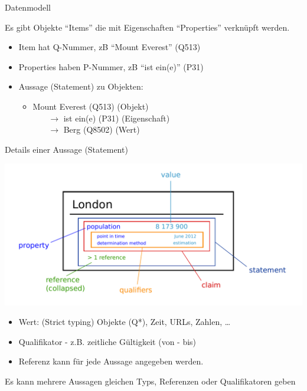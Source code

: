\documentclass{beamer}
\begin{document}
\begin{frame}{Datenmodell}

  Es gibt Objekte "`Items"' die mit Eigenschaften "`Properties"' verknüpft werden.

  \begin{itemize}
    \item Item hat Q-Nummer, zB "`Mount Everest"' (Q513) \pause

    \item  Properties haben P-Nummer, zB "`ist ein(e)"' (P31) \pause

    \item Aussage (Statement) zu Objekten:
    
    \begin{itemize}
      \item Mount Everest (Q513) (Objekt) \\
        ~~~ $\rightarrow$ ist ein(e) (P31) (Eigenschaft) \\
        ~~~ $\rightarrow$ Berg (Q8502) (Wert) 
    \end{itemize}

  \end{itemize}

\end{frame}

\begin{frame}{Details einer Aussage (Statement)}

 \vspace*{-0.2cm}
  \includegraphics[width=\textwidth]{Wikidata_statement.pdf}

 \vspace*{-0.4cm}
  \begin{itemize}
    \item Wert: (Strict typing) Objekte (Q*), Zeit, URLs, Zahlen, \dots \pause
    \item Qualifikator - z.B. zeitliche Gültigkeit (von - bis) \pause
    \item Referenz kann für jede Aussage angegeben werden. \pause
  \end{itemize}
Es kann mehrere Aussagen gleichen Typs, Referenzen oder Qualifikatoren geben
\end{frame}
\end{document}
